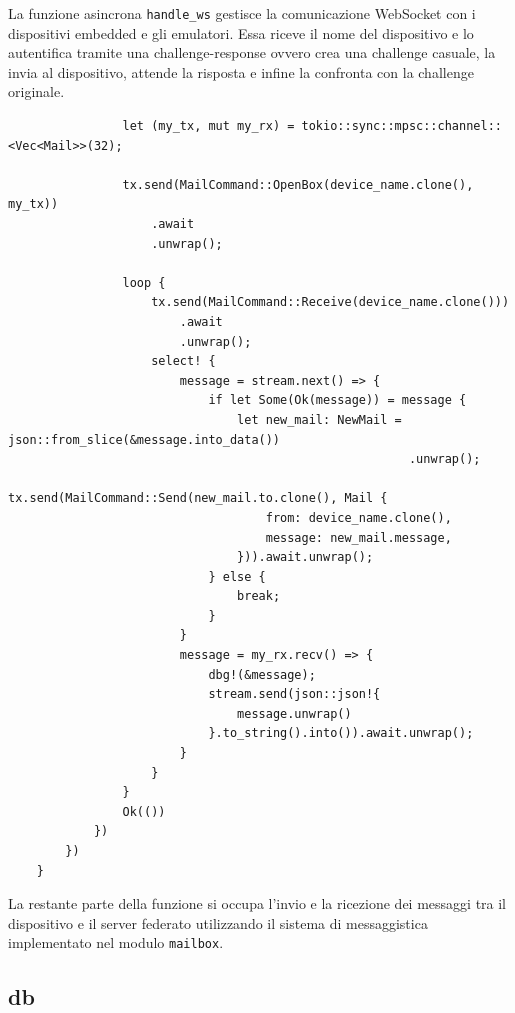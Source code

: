 La funzione asincrona \texttt{handle\_ws} gestisce la comunicazione WebSocket con i dispositivi embedded e gli 
emulatori. Essa riceve il nome del dispositivo e lo autentifica tramite una challenge-response ovvero
crea una challenge casuale, la invia al dispositivo, attende la risposta e infine la confronta con la challenge originale.

\begin{listing}[H]
    \begin{verbatim}
                let (my_tx, mut my_rx) = tokio::sync::mpsc::channel::<Vec<Mail>>(32);

                tx.send(MailCommand::OpenBox(device_name.clone(), my_tx))
                    .await
                    .unwrap();

                loop {
                    tx.send(MailCommand::Receive(device_name.clone()))
                        .await
                        .unwrap();
                    select! {
                        message = stream.next() => {
                            if let Some(Ok(message)) = message {
                                let new_mail: NewMail = json::from_slice(&message.into_data())
                                                        .unwrap();
                                tx.send(MailCommand::Send(new_mail.to.clone(), Mail {
                                    from: device_name.clone(),
                                    message: new_mail.message,
                                })).await.unwrap();
                            } else {
                                break;
                            }
                        }
                        message = my_rx.recv() => {
                            dbg!(&message);
                            stream.send(json::json!{
                                message.unwrap()
                            }.to_string().into()).await.unwrap();
                        }
                    }
                }
                Ok(())
            })
        })
    }
    \end{verbatim}
\end{listing}

La restante parte della funzione si occupa l'invio e la ricezione dei messaggi tra il dispositivo e il server federato
utilizzando il sistema di messaggistica implementato nel modulo \texttt{mailbox}.

\subsection{db}

